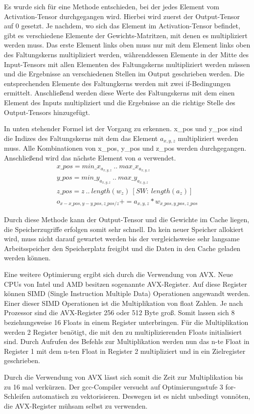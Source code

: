 \documentclass[../main.tex]{subfiles}
\begin{document}
Es wurde sich für eine Methode entschieden, bei der jedes Element vom Activation-Tensor durchgegangen wird. Hierbei wird zuerst der Output-Tensor auf 0 gesetzt. Je nachdem, wo sich das Element im Activation-Tensor befindet, gibt es verschiedene Elemente der Gewichts-Matritzen, mit denen es multipliziert werden muss. Das erste Element links oben muss nur mit dem Element links oben des Faltungskerns multipliziert werden, währenddessen Elemente in der Mitte des Input-Tensors mit allen Elementen des Faltungskerns multipliziert werden müssen und die Ergebnisse an verschiedenen Stellen im Output geschrieben werden. Die entsprechenden Elemente des Faltungkerns werden mit zwei if-Bedingungen ermittelt. Anschließend werden diese Werte des Faltungskerns mit dem einen Element des Inputs multipliziert und die Ergebnisse an die richtige Stelle des Output-Tensors hinzugefügt.

In unten stehender Formel ist der Vorgang zu erkennen. x\_pos und y\_pos sind die Indizes des Faltungskerns mit dem das Element \(a_{x,y,z}\) multipliziert werden muss. Alle Kombinationen von x\_pos, y\_pos und z\_pos werden durchgegangen. Anschließend wird das nächste Element von \(a\) verwendet.
\begin{equation}
\begin{split}
x\_pos = {min\_x_{a_{x,y,z}}\ ..\ max\_x_{a_{x,y,z}}}\\
y\_pos = {min\_y_{a_{x,y,z}}\ ..\ max\_y_{a_{x,y,z}}}\\
z\_pos = {z\ ..\ length(w_{z})\ [SW:\ length(a_{z})]}\\
o_{x-x\_pos,y-y\_pos,z\_pos/z} += a_{x,y,z}*w_{x\_pos,y\_pos,z\_pos}
\end{split}
\end{equation}

Durch diese Methode kann der Output-Tensor und die Gewichte im Cache liegen, die Speicherzugriffe erfolgen somit sehr schnell. Da kein neuer Speicher allokiert wird, muss nicht darauf gewartet werden bis der vergleichsweise sehr langsame Arbeitsspeicher den Speicherplatz freigibt und die Daten in den Cache geladen werden können. 

Eine weitere Optimierung ergibt sich durch die Verwendung von AVX. Neue CPUs von Intel und AMD besitzen sogenannte AVX-Register. Auf diese Register können SIMD (Single Instruction Multiple Data) Operationen angewandt werden. Einer dieser SIMD Operationen ist die Multiplikation von float Zahlen.
Je nach Prozessor sind die AVX-Register 256 oder 512 Byte groß. Somit lassen sich 8 beziehungsweise 16 Floats in einem Register unterbringen. Für die Multiplikation werden 2 Register benötigt, die mit den zu multiplizierenden Floats initialisiert sind. Durch Aufrufen des Befehls zur Multiplikation werden nun das n-te Float in Register 1 mit dem n-ten Float in Register 2 multipliziert und in ein Zielregister geschrieben.

Durch die Verwendung von AVX lässt sich somit die Zeit zur Multiplikation bis zu 16 mal verkürzen. Der gcc-Compiler versucht auf Optimierungsstufe 3 for-Schleifen automatisch zu vektorisieren. Deswegen ist es nicht unbedingt vonnöten, die AVX-Register mühsam selbst zu verwenden. 
\end{document}
